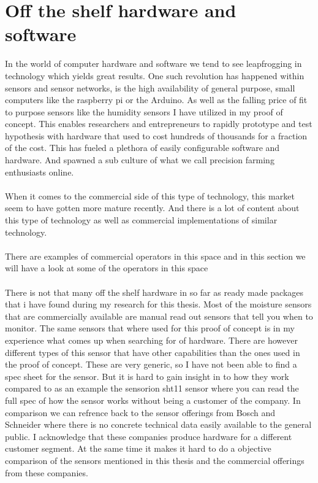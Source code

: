 \documentclass[]{uiophd}
\begin{document}
\section{Off the shelf hardware and software}
In the world of computer hardware and software we tend to see leapfrogging in technology which yields great results. One such revolution has happened within sensors and sensor networks, is the high availability of general purpose, small computers like the raspberry pi or the Arduino. As well as the falling price of fit to purpose sensors like the humidity sensors I have utilized in my proof of concept. This enables researchers and entrepreneurs to rapidly prototype and test hypothesis with hardware that used to cost hundreds of thousands for a fraction of the cost. This has fueled a plethora of easily configurable software and hardware. And spawned a sub culture of what we call precision farming enthusiasts online. 
\\\\
When it comes to the commercial side of this type of technology, this market seem to have gotten more mature recently. And there is a lot of content about this type of technology as well as commercial implementations of similar technology.
\\\\
There are examples of commercial operators in this space and in this section we will have a look at some of the operators in this space
\\\\
There is not that many off the shelf hardware in so far as ready made packages that i have found during my research for this thesis. Most of the moisture sensors that are commercially available are manual read out sensors that tell you when to monitor. The same sensors that where used for this proof of concept is in my experience what comes up when searching for  of hardware. There are however different types of this sensor that have other capabilities than the ones used in the proof of concept. These are very generic, so I have not been able to find a spec sheet for the sensor. But it is hard to gain insight in to how they work compared to as an example the sensorion sht11 sensor\parencite{sensorion} where you can read the full spec of how the sensor works without being a customer of the company. In comparison we can refrence back to the sensor offerings from Bosch and Schneider where there is no concrete technical data easily available to the general public. I acknowledge that these companies produce hardware for a different customer segment. At the same time it makes it hard to do a objective comparison of the sensors mentioned in this thesis and the commercial offerings from these companies.
\end{document}
